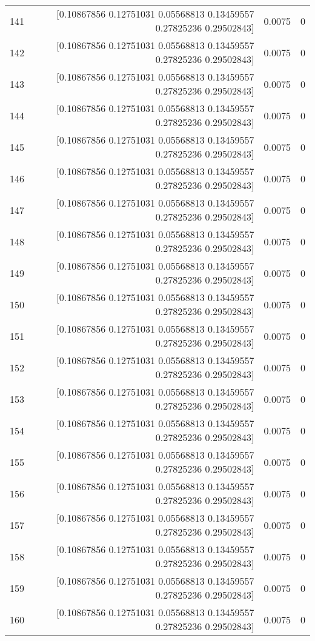\begin{longtable}{lrrr}
141 & [0.10867856 0.12751031 0.05568813 0.13459557 0.27825236 0.29502843] & 0.0075 & 0 \\
142 & [0.10867856 0.12751031 0.05568813 0.13459557 0.27825236 0.29502843] & 0.0075 & 0 \\
143 & [0.10867856 0.12751031 0.05568813 0.13459557 0.27825236 0.29502843] & 0.0075 & 0 \\
144 & [0.10867856 0.12751031 0.05568813 0.13459557 0.27825236 0.29502843] & 0.0075 & 0 \\
145 & [0.10867856 0.12751031 0.05568813 0.13459557 0.27825236 0.29502843] & 0.0075 & 0 \\
146 & [0.10867856 0.12751031 0.05568813 0.13459557 0.27825236 0.29502843] & 0.0075 & 0 \\
147 & [0.10867856 0.12751031 0.05568813 0.13459557 0.27825236 0.29502843] & 0.0075 & 0 \\
148 & [0.10867856 0.12751031 0.05568813 0.13459557 0.27825236 0.29502843] & 0.0075 & 0 \\
149 & [0.10867856 0.12751031 0.05568813 0.13459557 0.27825236 0.29502843] & 0.0075 & 0 \\
150 & [0.10867856 0.12751031 0.05568813 0.13459557 0.27825236 0.29502843] & 0.0075 & 0 \\
151 & [0.10867856 0.12751031 0.05568813 0.13459557 0.27825236 0.29502843] & 0.0075 & 0 \\
152 & [0.10867856 0.12751031 0.05568813 0.13459557 0.27825236 0.29502843] & 0.0075 & 0 \\
153 & [0.10867856 0.12751031 0.05568813 0.13459557 0.27825236 0.29502843] & 0.0075 & 0 \\
154 & [0.10867856 0.12751031 0.05568813 0.13459557 0.27825236 0.29502843] & 0.0075 & 0 \\
155 & [0.10867856 0.12751031 0.05568813 0.13459557 0.27825236 0.29502843] & 0.0075 & 0 \\
156 & [0.10867856 0.12751031 0.05568813 0.13459557 0.27825236 0.29502843] & 0.0075 & 0 \\
157 & [0.10867856 0.12751031 0.05568813 0.13459557 0.27825236 0.29502843] & 0.0075 & 0 \\
158 & [0.10867856 0.12751031 0.05568813 0.13459557 0.27825236 0.29502843] & 0.0075 & 0 \\
159 & [0.10867856 0.12751031 0.05568813 0.13459557 0.27825236 0.29502843] & 0.0075 & 0 \\
160 & [0.10867856 0.12751031 0.05568813 0.13459557 0.27825236 0.29502843] & 0.0075 & 0 \\

\end{longtable}
